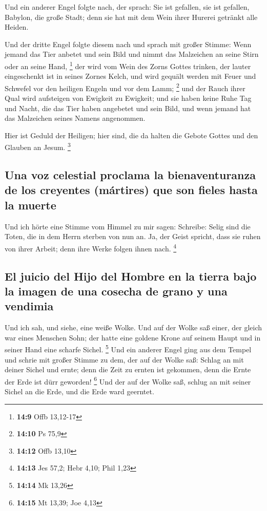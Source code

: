  Und ein anderer Engel folgte nach, der sprach: Sie ist
gefallen, sie ist gefallen, Babylon, die große Stadt; denn sie hat mit
dem Wein ihrer Hurerei getränkt alle Heiden.

 Und der dritte Engel folgte diesem nach und sprach mit
großer Stimme: Wenn jemand das Tier anbetet und sein Bild und nimmt das
Malzeichen an seine Stirn oder an seine Hand, \footnote{\textbf{14:9}
  Offb 13,12-17}  der wird vom Wein des Zorns Gottes
trinken, der lauter eingeschenkt ist in seines Zornes Kelch, und wird
gequält werden mit Feuer und Schwefel vor den heiligen Engeln und vor
dem Lamm; \footnote{\textbf{14:10} Ps 75,9}  und der
Rauch ihrer Qual wird aufsteigen von Ewigkeit zu Ewigkeit; und sie haben
keine Ruhe Tag und Nacht, die das Tier haben angebetet und sein Bild,
und wenn jemand hat das Malzeichen seines Namens angenommen.

 Hier ist Geduld der Heiligen; hier sind, die da halten
die Gebote Gottes und den Glauben an Jesum. \footnote{\textbf{14:12}
  Offb 13,10}

\hypertarget{una-voz-celestial-proclama-la-bienaventuranza-de-los-creyentes-muxe1rtires-que-son-fieles-hasta-la-muerte}{%
\subsection{Una voz celestial proclama la bienaventuranza de los
creyentes (mártires) que son fieles hasta la
muerte}\label{una-voz-celestial-proclama-la-bienaventuranza-de-los-creyentes-muxe1rtires-que-son-fieles-hasta-la-muerte}}

 Und ich hörte eine Stimme vom Himmel zu mir sagen:
Schreibe: Selig sind die Toten, die in dem Herrn sterben von nun an. Ja,
der Geist spricht, dass sie ruhen von ihrer Arbeit; denn ihre Werke
folgen ihnen nach. \footnote{\textbf{14:13} Jes 57,2; Hebr 4,10; Phil
  1,23}

\hypertarget{el-juicio-del-hijo-del-hombre-en-la-tierra-bajo-la-imagen-de-una-cosecha-de-grano-y-una-vendimia}{%
\subsection{El juicio del Hijo del Hombre en la tierra bajo la imagen de
una cosecha de grano y una
vendimia}\label{el-juicio-del-hijo-del-hombre-en-la-tierra-bajo-la-imagen-de-una-cosecha-de-grano-y-una-vendimia}}

 Und ich sah, und siehe, eine weiße Wolke. Und auf der
Wolke saß einer, der gleich war eines Menschen Sohn; der hatte eine
goldene Krone auf seinem Haupt und in seiner Hand eine scharfe Sichel.
\footnote{\textbf{14:14} Mk 13,26}  Und ein anderer Engel
ging aus dem Tempel und schrie mit großer Stimme zu dem, der auf der
Wolke saß: Schlag an mit deiner Sichel und ernte; denn die Zeit zu
ernten ist gekommen, denn die Ernte der Erde ist dürr geworden!
\footnote{\textbf{14:15} Mt 13,39; Joe 4,13}  Und der auf
der Wolke saß, schlug an mit seiner Sichel an die Erde, und die Erde
ward geerntet.

